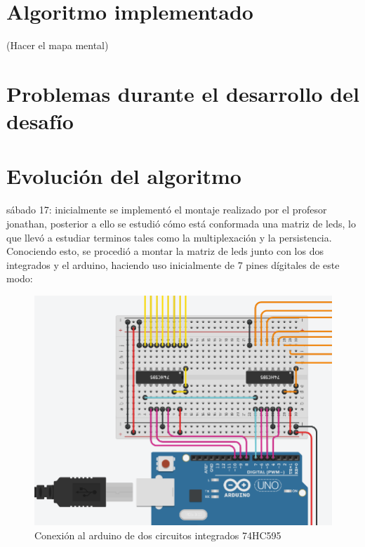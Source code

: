 \documentclass{article}
\begin{document}
\section{Algoritmo implementado} \label{imagenes}
(Hacer el mapa mental)
\section{Problemas durante el desarrollo del desafío}

\label{imagenes}
\section{Evolución del algoritmo} \label{imagenes}
sábado 17: inicialmente se implementó el montaje realizado por el profesor jonathan, posterior a ello se estudió cómo está conformada una matriz de leds, lo que llevó a estudiar terminos tales como la multiplexación y la persistencia. Conociendo esto, se procedió a montar la matriz de leds junto con los dos integrados y el arduino, haciendo uso inicialmente de 7 pines dígitales de este modo:

\begin{figure}[h]
\includegraphics[scale=0.5]{pinesarduino.png}
\centering
\caption{Conexión al arduino de dos circuitos integrados 74HC595}
\label{fig:pinesarduinos}
\end{figure}
\end{document}

